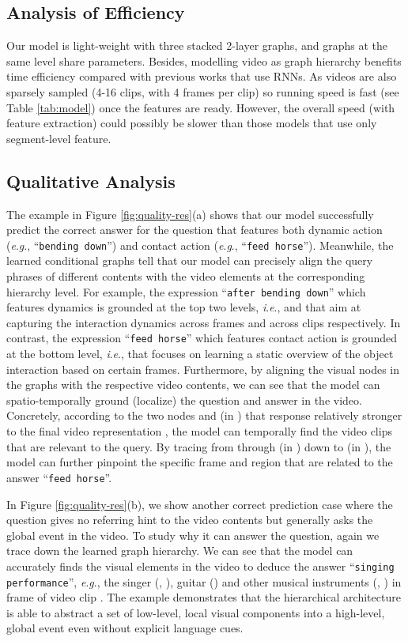 \documentclass[letterpaper]{article} \usepackage{aaai21}  \usepackage{times}  \usepackage{helvet} \usepackage{courier}  \usepackage[hyphens]{url}  \usepackage{graphicx} \urlstyle{rm} \def\UrlFont{\rm}  \usepackage{natbib}  \usepackage{caption} \usepackage{color, colortbl}
\newcommand{\ie}{\textit{i}.\textit{e}.}
\newcommand{\eg}{\textit{e}.\textit{g}.}
\begin{document}
\subsection{Analysis of Efficiency}
Our model is light-weight with three stacked 2-layer graphs, and graphs at the same level share parameters. Besides, modelling video as graph hierarchy benefits time efficiency compared with previous works that use RNNs. As videos are also sparsely sampled (4-16 clips, with 4 frames per clip) so running speed is fast (see Table \ref{tab:model}) once the features are ready. However, the overall speed (with feature extraction) could possibly be slower than those models that use only segment-level feature.



\subsection{Qualitative Analysis}


The example in Figure \ref{fig:quality-res}(a) shows that our model successfully predict the correct answer for the question that features both dynamic action (\eg, ``\texttt{bending down}'') and contact action (\eg, ``\texttt{feed horse}''). Meanwhile, the learned conditional graphs tell that our model can precisely align the query phrases of different contents with the video elements at the corresponding hierarchy level. For example, the expression ``\texttt{after bending down}'' which features dynamics is grounded at the top two levels, \ie,  and  that aim at capturing the interaction dynamics across frames and across clips respectively. In contrast, the expression ``\texttt{feed horse}'' which features contact action is grounded at the bottom level, \ie,  that focuses on learning a static overview of the object interaction based on certain frames. Furthermore, by aligning the visual nodes in the graphs with the respective video contents, we can see that the model can spatio-temporally ground (localize) the question and answer in the video. Concretely, according to the two nodes  and  (in ) that response relatively stronger to the final video representation , the model can temporally find the video clips that are relevant to the query. By tracing from  through  (in ) down to  (in ), the model can further pinpoint the specific frame and region that are related to the answer ``\texttt{feed horse}''.

In Figure \ref{fig:quality-res}(b), we show another correct prediction case where the question gives no referring hint to the video contents but generally asks the global event in the video. To study why it can answer the question, again we trace down the learned graph hierarchy. We can see that the model can accurately finds the visual elements in the video to deduce the answer ``\texttt{singing performance}'', \eg, the singer (, ), guitar () and other musical instruments (, ) in frame  of video clip . The example demonstrates that the hierarchical architecture is able to abstract a set of low-level, local visual components into a high-level, global event even without explicit language cues.
\end{document}
